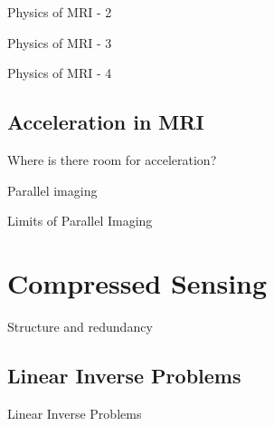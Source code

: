 \documentclass[aspectratio=169,xcolor=dvipsnames]{beamer}
\begin{document}
\begin{frame}{Physics of MRI - 2}
\end{frame}

\begin{frame}{Physics of MRI - 3}
\end{frame}

\begin{frame}{Physics of MRI - 4}
\end{frame}

\subsection{Acceleration in MRI}
\begin{frame}{Where is there room for acceleration?}
\end{frame}

\begin{frame}{Parallel imaging}
\end{frame}

\begin{frame}{Limits of Parallel Imaging}
\end{frame}

\section{Compressed Sensing}
\begin{frame}{Structure and redundancy}
\end{frame}

\subsection{Linear Inverse Problems}
\begin{frame}{Linear Inverse Problems}
\end{frame}
\end{document}
